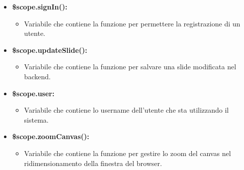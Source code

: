 \begin{itemize}
	\item \textbf{\$scope.signIn():}
	\begin{itemize}
		\item Variabile che contiene la funzione per permettere la registrazione di un utente.
	\end{itemize}
	
	\item \textbf{\$scope.updateSlide():}
	\begin{itemize}
		\item Variabile che contiene la funzione per salvare una slide modificata nel backend.
	\end{itemize}
	
	\item \textbf{\$scope.user:}
	\begin{itemize}
		\item Variabile che contiene lo username dell'utente che sta utilizzando il sistema.
	\end{itemize}
	
	\item \textbf{\$scope.zoomCanvas():}
	\begin{itemize}
		\item Variabile che contiene la funzione per gestire lo zoom del canvas nel ridimensionamento della finestra del browser.
	\end{itemize}
	
\end{itemize}
